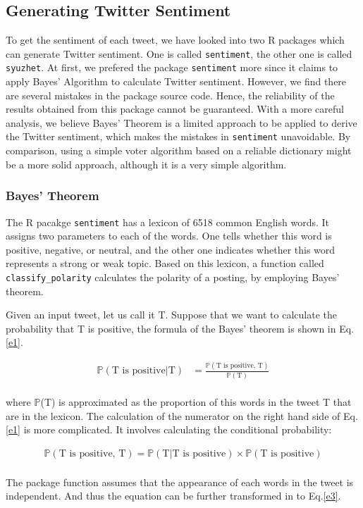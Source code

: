 \documentclass[10pt,letterpaper]{article}
\begin{document}
\subsection{Generating Twitter Sentiment} 
To get the sentiment of each tweet, we have looked into two R packages which can generate Twitter sentiment. One is called \texttt{sentiment}, the other one is called \texttt{syuzhet}. At first, we prefered the package \texttt{sentiment} more since it claims to apply Bayes' Algorithm to calculate Twitter sentiment. However, we find there are several mistakes in the package source code. Hence, the reliability of the results obtained from this package cannot be guaranteed. With a more careful analysis, we believe Bayes' Theorem is a limited approach to be applied to derive the Twitter sentiment, which makes the mistakes in \texttt{sentiment} unavoidable. By comparison, using a simple voter algorithm based on a reliable dictionary might be a more solid approach, although it is a very simple algorithm.  



\subsubsection{Bayes' Theorem}
 The R pacakge \texttt{sentiment} has a lexicon of 6518 common English words. It assigns two parameters to each of the words. One tells whether this word is positive, negative, or neutral, and the other one indicates whether this word represents a strong or weak topic. Based on this lexicon, a function called  \texttt{classify\_polarity} calculates the polarity of a posting, by employing Bayes' theorem. 

Given an input tweet, let us call it T. Suppose that we want to calculate the probability that T is positive, the formula of the Bayes' theorem is shown in Eq.\ref{e1}. 


\begin{align}\label{e1}
\mathbb{P}(\text{T is positive}|\text{T}) &= \frac{\mathbb{P}(\text{T is positive, } \text{T})}{\mathbb{P}(\text{T})}  
\end{align}
\\
where $\mathbb{P}$(T) is approximated as the proportion of this words in the tweet T that are in the lexicon. The calculation of the numerator on the right hand side of Eq.\ref{e1} is more complicated. It involves calculating the conditional probability:

\begin{align}\label{e2}
\mathbb{P}(\text{T is positive, T}) = \mathbb{P}(\text{T}|\text{T is positive}) \times \mathbb{P}(\text{T is positive})
\end{align}
\\
\noindent The package function assumes that the appearance of each words in the tweet is independent. And thus the equation can be further transformed in to Eq.\ref{e3}. 
\end{document}

